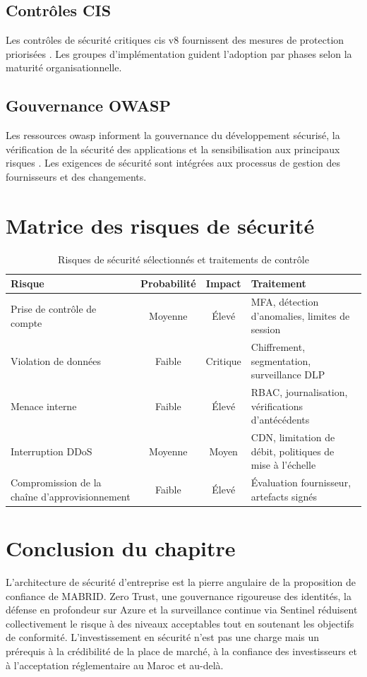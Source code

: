 \subsection{Contrôles CIS}

Les contrôles de sécurité critiques \gls{cis} v8 fournissent des mesures de protection priorisées \parencite{ciscontrols18}. Les groupes d'implémentation guident l'adoption par phases selon la maturité organisationnelle.

\subsection{Gouvernance OWASP}

Les ressources \gls{owasp} informent la gouvernance du développement sécurisé, la vérification de la sécurité des applications et la sensibilisation aux principaux risques \parencite{owaspTop10}. Les exigences de sécurité sont intégrées aux processus de gestion des fournisseurs et des changements.

\section{Matrice des risques de sécurité}

\begin{table}[H]
  \centering
  \caption{Risques de sécurité sélectionnés et traitements de contrôle}
  \label{tab:sec-risk}
  \small
  \begin{tabularx}{\textwidth}{@{}lccX@{}}
    \toprule
    \textbf{Risque} & \textbf{Probabilité} & \textbf{Impact} & \textbf{Traitement} \\
    \midrule
    Prise de contrôle de compte & Moyenne & Élevé & MFA, détection d'anomalies, limites de session \\
    Violation de données & Faible & Critique & Chiffrement, segmentation, surveillance DLP \\
    Menace interne & Faible & Élevé & RBAC, journalisation, vérifications d'antécédents \\
    Interruption DDoS & Moyenne & Moyen & CDN, limitation de débit, politiques de mise à l'échelle \\
    Compromission de la chaîne d'approvisionnement & Faible & Élevé & Évaluation fournisseur, artefacts signés \\
    \bottomrule
  \end{tabularx}
\end{table}

\section{Conclusion du chapitre}

L'architecture de sécurité d'entreprise est la pierre angulaire de la proposition de confiance de MABRID. Zero Trust, une gouvernance rigoureuse des identités, la défense en profondeur sur Azure et la surveillance continue via Sentinel réduisent collectivement le risque à des niveaux acceptables tout en soutenant les objectifs de conformité. L'investissement en sécurité n'est pas une charge mais un prérequis à la crédibilité de la place de marché, à la confiance des investisseurs et à l'acceptation réglementaire au Maroc et au-delà.
